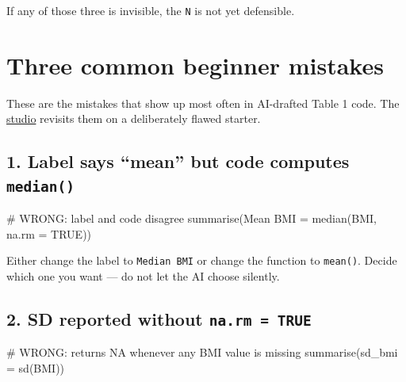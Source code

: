 \documentclass[
  letterpaper,
  DIV=11,
  numbers=noendperiod,
  oneside]{scrreprt}
\newenvironment{Shaded}{\begin{snugshade}}{\end{snugshade}}
\newcommand{\AttributeTok}[1]{\textcolor[rgb]{0.40,0.45,0.13}{#1}}
\newcommand{\CommentTok}[1]{\textcolor[rgb]{0.37,0.37,0.37}{#1}}
\newcommand{\ConstantTok}[1]{\textcolor[rgb]{0.56,0.35,0.01}{#1}}
\newcommand{\FunctionTok}[1]{\textcolor[rgb]{0.28,0.35,0.67}{#1}}
\newcommand{\NormalTok}[1]{\textcolor[rgb]{0.00,0.23,0.31}{#1}}
\newcommand{\OtherTok}[1]{\textcolor[rgb]{0.00,0.23,0.31}{#1}}
\newcommand{\StringTok}[1]{\textcolor[rgb]{0.13,0.47,0.30}{#1}}
\begin{document}
If any of those three is invisible, the \texttt{N} is not yet
defensible.

\section*{Three common beginner
mistakes}\label{three-common-beginner-mistakes}


These are the mistakes that show up most often in AI-drafted Table 1
code. The \href{eda06-studio-planted-errors.qmd}{studio} revisits them
on a deliberately flawed starter.

\subsection*{\texorpdfstring{1. Label says ``mean'' but code computes
\texttt{median()}}{1. Label says ``mean'' but code computes median()}}\label{label-says-mean-but-code-computes-median}

\begin{Shaded}
\begin{Highlighting}[numbers=left,,]
\CommentTok{\# WRONG: label and code disagree}
\FunctionTok{summarise}\NormalTok{(}\StringTok{\textasciigrave{}}\AttributeTok{Mean BMI}\StringTok{\textasciigrave{}} \OtherTok{=} \FunctionTok{median}\NormalTok{(BMI, }\AttributeTok{na.rm =} \ConstantTok{TRUE}\NormalTok{))}
\end{Highlighting}
\end{Shaded}

Either change the label to \texttt{Median\ BMI} or change the function
to \texttt{mean()}. Decide which one you want --- do not let the AI
choose silently.

\subsection*{\texorpdfstring{2. SD reported without
\texttt{na.rm\ =\ TRUE}}{2. SD reported without na.rm = TRUE}}\label{sd-reported-without-na.rm-true}

\begin{Shaded}
\begin{Highlighting}[numbers=left,,]
\CommentTok{\# WRONG: returns NA whenever any BMI value is missing}
\FunctionTok{summarise}\NormalTok{(}\AttributeTok{sd\_bmi =} \FunctionTok{sd}\NormalTok{(BMI))}
\end{Highlighting}
\end{Shaded}
\end{document}
